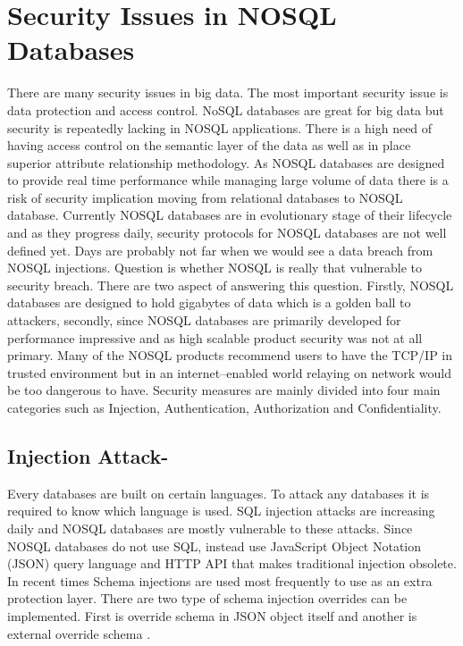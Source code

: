 \section{Security Issues in NOSQL Databases }
There are many security issues in big data. The most important security issue is data protection and access control\cite{editor02}. NoSQL databases are great for big data but security is repeatedly lacking in NOSQL applications. There is a high need of having access control on the semantic layer of the data as well as in place superior attribute relationship methodology. As NOSQL databases are designed to provide real time performance while managing large volume of data there is a risk of security implication moving from relational databases to NOSQL database. Currently NOSQL databases are in evolutionary stage of their lifecycle and as they progress daily, security protocols for NOSQL databases are not well defined yet. Days are probably not far when we would see a data breach from NOSQL injections\cite{editor02}.  Question is whether NOSQL is really that vulnerable to security breach. There are two aspect of answering this question. Firstly, NOSQL databases are designed to hold gigabytes of data which is a golden ball to attackers, secondly, since NOSQL databases are primarily developed for performance impressive and as high scalable product security was not at all primary. Many of the NOSQL products recommend users to have the TCP/IP in trusted environment but in an internet–enabled world relaying on network would be too dangerous to have. Security measures are mainly divided into four main categories such as Injection, Authentication, Authorization and Confidentiality.


\subsection{Injection Attack-} Every databases are built on certain languages. To attack any databases it is required to know which language is used. SQL injection attacks are increasing daily and NOSQL databases are mostly vulnerable to these attacks. Since NOSQL databases do not use SQL, instead use JavaScript Object Notation (JSON) query language and HTTP API that makes traditional injection obsolete. In recent times Schema injections are used most frequently to use as an extra protection layer. There are two type of schema injection overrides can be implemented. First is override schema in JSON object itself and another is external override schema \cite{editor03}.

